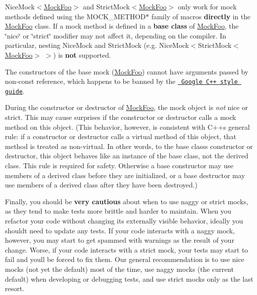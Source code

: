 \begin{DoxyEnumerate}
\item {\ttfamily Nice\+Mock$<$\mbox{\hyperlink{classMockFoo}{Mock\+Foo}}$>$} and {\ttfamily Strict\+Mock$<$\mbox{\hyperlink{classMockFoo}{Mock\+Foo}}$>$} only work for mock methods defined using the {\ttfamily M\+O\+C\+K\+\_\+\+M\+E\+T\+H\+O\+D$\ast$} family of macros {\bfseries{directly}} in the {\ttfamily \mbox{\hyperlink{classMockFoo}{Mock\+Foo}}} class. If a mock method is defined in a {\bfseries{base class}} of {\ttfamily \mbox{\hyperlink{classMockFoo}{Mock\+Foo}}}, the \char`\"{}nice\char`\"{} or \char`\"{}strict\char`\"{} modifier may not affect it, depending on the compiler. In particular, nesting {\ttfamily Nice\+Mock} and {\ttfamily Strict\+Mock} (e.\+g. {\ttfamily Nice\+Mock$<$Strict\+Mock$<$\mbox{\hyperlink{classMockFoo}{Mock\+Foo}}$>$ $>$}) is {\bfseries{not}} supported.
\end{DoxyEnumerate}
\begin{DoxyEnumerate}
\item The constructors of the base mock ({\ttfamily \mbox{\hyperlink{classMockFoo}{Mock\+Foo}}}) cannot have arguments passed by non-\/const reference, which happens to be banned by the \href{https://google.github.io/styleguide/cppguide.html}{\texttt{ Google C++ style guide}}.
\end{DoxyEnumerate}
\begin{DoxyEnumerate}
\item During the constructor or destructor of {\ttfamily \mbox{\hyperlink{classMockFoo}{Mock\+Foo}}}, the mock object is {\itshape not} nice or strict. This may cause surprises if the constructor or destructor calls a mock method on {\ttfamily this} object. (This behavior, however, is consistent with C++\textquotesingle{}s general rule\+: if a constructor or destructor calls a virtual method of {\ttfamily this} object, that method is treated as non-\/virtual. In other words, to the base class\textquotesingle{}s constructor or destructor, {\ttfamily this} object behaves like an instance of the base class, not the derived class. This rule is required for safety. Otherwise a base constructor may use members of a derived class before they are initialized, or a base destructor may use members of a derived class after they have been destroyed.)
\end{DoxyEnumerate}

Finally, you should be {\bfseries{very cautious}} about when to use naggy or strict mocks, as they tend to make tests more brittle and harder to maintain. When you refactor your code without changing its externally visible behavior, ideally you should\textquotesingle{}t need to update any tests. If your code interacts with a naggy mock, however, you may start to get spammed with warnings as the result of your change. Worse, if your code interacts with a strict mock, your tests may start to fail and you\textquotesingle{}ll be forced to fix them. Our general recommendation is to use nice mocks (not yet the default) most of the time, use naggy mocks (the current default) when developing or debugging tests, and use strict mocks only as the last resort.

